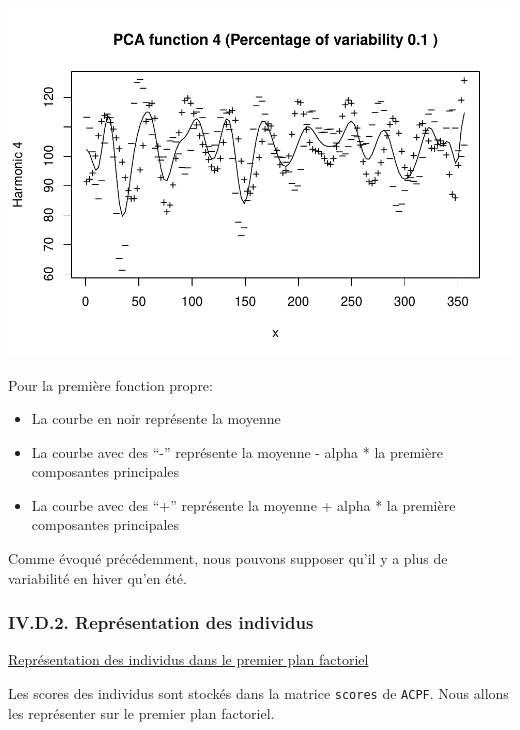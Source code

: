 \documentclass[
]{article}
\newenvironment{Shaded}{\begin{snugshade}}{\end{snugshade}}
\newcommand{\FunctionTok}[1]{\textcolor[rgb]{0.00,0.00,0.00}{#1}}
\newcommand{\NormalTok}[1]{#1}
\newcommand{\SpecialCharTok}[1]{\textcolor[rgb]{0.00,0.00,0.00}{#1}}
\begin{document}
\includegraphics{Projet_CHESNAIS_GUIBERT_files/figure-latex/unnamed-chunk-46-4.pdf}

Pour la première fonction propre:

\begin{itemize}
\item
  La courbe en noir représente la moyenne
\item
  La courbe avec des ``-'' représente la moyenne - alpha * la première
  composantes principales
\item
  La courbe avec des ``+'' représente la moyenne + alpha * la première
  composantes principales
\end{itemize}

Comme évoqué précédemment, nous pouvons supposer qu'il y a plus de
variabilité en hiver qu'en été.

\hypertarget{iv.d.2.-repruxe9sentation-des-individus}{%
\subsubsection{IV.D.2. Représentation des
individus}\label{iv.d.2.-repruxe9sentation-des-individus}}

\uline{Représentation des individus dans le premier plan factoriel}

Les scores des individus sont stockés dans la matrice \texttt{scores} de
\texttt{ACPF}. Nous allons les représenter sur le premier plan
factoriel.

\begin{Shaded}
\end{Shaded}
\end{document}
